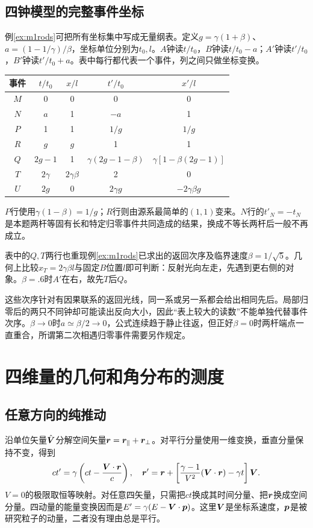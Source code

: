 \subsection{四钟模型的完整事件坐标}
例\ref{ex:m1rods}可把所有坐标集中写成无量纲表。定义$g=\gamma(1+\beta)$、$a=(1-1/\gamma)/\beta$，坐标单位分别为$t_0,l$。$A$钟读$t/t_0$，$B$钟读$t/t_0-a$；$A'$钟读$t'/t_0$，$B'$钟读$t'/t_0+a$。表中每行都代表一个事件，列之间只做坐标变换。
\begin{center}\small
\begin{tabular}{ccccc}\toprule
事件&$t/t_0$&$x/l$&$t'/t_0$&$x'/l$\\\midrule
$M$&0&0&0&0\\
$N$&$a$&1&$-a$&1\\
$P$&1&1&$1/g$&$1/g$\\
$R$&$g$&$g$&1&1\\
$Q$&$2g-1$&1&$\gamma(2g-1-\beta)$&$\gamma[1-\beta(2g-1)]$\\
$T$&$2\gamma$&$2\gamma\beta$&2&0\\
$U$&$2g$&0&$2\gamma g$&$-2\gamma\beta g$\\\bottomrule
\end{tabular}
\end{center}
$P$行使用$\gamma(1-\beta)=1/g$；$R$行则由源系最简单的$(1,1)$变来。$N$行的$t'_N=-t_N$是本题两杆等固有长和特定归零事件共同造成的结果，换成不等长两杆后一般不再成立。

表中的$Q,T$两行也重现例\ref{ex:m1rods}已求出的返回次序及临界速度$\beta=1/\sqrt5$。几何上比较$x_T=2\gamma\beta l$与固定$B$位置$l$即可判断：反射光向左走，先遇到更右侧的对象。$\beta=.6$时$A'$在右，故先$T$后$Q$。

这些次序针对有因果联系的返回光线，同一系或另一系都会给出相同先后。局部归零后的两只不同钟却可能读出反向大小，因此“表上较大的读数”不能单独代替事件次序。$\beta\to0$时$a\simeq\beta/2\to0$，公式连续趋于静止往返，但正好$\beta=0$时两杆端点一直重合，所谓第二次相遇归零事件需要另作规定。

\section{四维量的几何和角分布的测度}
\subsection{任意方向的纯推动}
沿单位矢量$\hat{\bm{V}}$分解空间矢量$\bm{r}=\bm{r}_\parallel+\bm{r}_\perp$。对平行分量使用一维变换，垂直分量保持不变，得到
\[
 ct'=\gamma\left(ct-\frac{\bm{V}\cdot\bm{r}}{c}\right),\quad
 \bm{r}'=\bm{r}+\left[\frac{\gamma-1}{V^2}(\bm{V}\cdot\bm{r})-\gamma t\right]\bm{V}.
\]
$V=0$的极限取恒等映射。对任意四矢量，只需把$ct$换成其时间分量、把$\bm{r}$换成空间分量。四动量的能量变换因而是$E'=\gamma(E-\bm{V}\cdot\bm{p})$。这里$\bm{V}$是坐标系速度，$\bm{p}$是被研究粒子的动量，二者没有理由总是平行。

